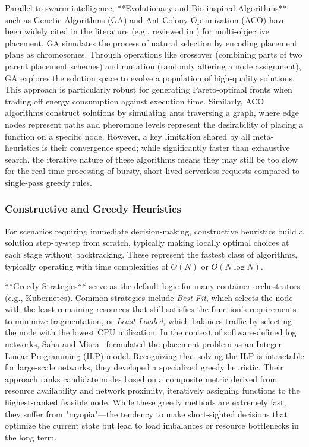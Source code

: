 \documentclass[lettersize,journal]{IEEEtran}
\begin{document}
Parallel to swarm intelligence, **Evolutionary and Bio-inspired Algorithms** such as Genetic Algorithms (GA) and Ant Colony Optimization (ACO) have been widely cited in the literature (e.g., reviewed in \cite{hua2024Thesis}) for multi-objective placement. GA simulates the process of natural selection by encoding placement plans as chromosomes. Through operations like crossover (combining parts of two parent placement schemes) and mutation (randomly altering a node assignment), GA explores the solution space to evolve a population of high-quality solutions. This approach is particularly robust for generating Pareto-optimal fronts when trading off energy consumption against execution time. Similarly, ACO algorithms construct solutions by simulating ants traversing a graph, where edge nodes represent paths and pheromone levels represent the desirability of placing a function on a specific node. However, a key limitation shared by all meta-heuristics is their convergence speed; while significantly faster than exhaustive search, the iterative nature of these algorithms means they may still be too slow for the real-time processing of bursty, short-lived serverless requests compared to single-pass greedy rules.

\subsubsection{Constructive and Greedy Heuristics}
For scenarios requiring immediate decision-making, constructive heuristics build a solution step-by-step from scratch, typically making locally optimal choices at each stage without backtracking. These represent the fastest class of algorithms, typically operating with time complexities of $O(N)$ or $O(N \log N)$.

**Greedy Strategies** serve as the default logic for many container orchestrators (e.g., Kubernetes). Common strategies include \textit{Best-Fit}, which selects the node with the least remaining resources that still satisfies the function's requirements to minimize fragmentation, or \textit{Least-Loaded}, which balances traffic by selecting the node with the lowest CPU utilization. In the context of software-defined fog networks, Saha and Misra~\cite{saha2019SDF} formulated the placement problem as an Integer Linear Programming (ILP) model. Recognizing that solving the ILP is intractable for large-scale networks, they developed a specialized greedy heuristic. Their approach ranks candidate nodes based on a composite metric derived from resource availability and network proximity, iteratively assigning functions to the highest-ranked feasible node. While these greedy methods are extremely fast, they suffer from "myopia"—the tendency to make short-sighted decisions that optimize the current state but lead to load imbalances or resource bottlenecks in the long term.
\end{document}
